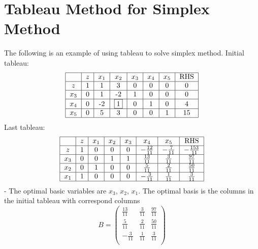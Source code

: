 			\section{Tableau Method for Simplex Method}
				The following is an example of using tableau to solve simplex method.
					Initial tableau:\\
					\begin{align}
						\begin{tabular} {|c|c|c|c|c|c|c|c|}
							\hline
							& $z$ & $x_1$ & $x_2$ & $x_3$ & $x_4$ & $x_5$ & RHS \\
							\hline
							$z$ & 1 & 1 & 3 & 0 & 0 & 0 & 0 \\
							\hline
							$x_3$ & 0 & 1 & -2 & 1 & 0 & 0 & 0 \\
							\hline
							$x_4$ & 0 & -2 & \framebox{1} & 0 & 1 & 0 & 4\\
							\hline
							$x_5$ & 0 & 5 & 3 & 0 & 0 & 1 & 15 \\
							\hline
						\end{tabular}
					\end{align}
					Last tableau:\\
					\begin{align}
						\begin{tabular} {|c|c|c|c|c|c|c|c|}
							\hline
							& $z$ & $x_1$ & $x_2$ & $x_3$ & $x_4$ & $x_5$ & RHS \\
							\hline
							$z$ & 1 & 0 & 0 & 0 & $-\frac{12}{11}$ & $-\frac{7}{11}$ & $-\frac{153}{11}$ \\
							\hline
							$x_3$ & 0 & 0 & 1 & 1 & $\frac{13}{11}$ & $\frac{3}{11}$ & $\frac{97}{11}$ \\
							\hline
							$x_2$ & 0 & 1 & 0 & 0 & $\frac{5}{11}$ & $\frac{2}{11}$ & $\frac{50}{11}$ \\
							\hline
							$x_1$ & 1 & 0 & 0 & 0 & $-\frac{3}{11}$ & $\frac{1}{11}$ & $\frac{3}{11}$ \\
							\hline
						\end{tabular}
					\end{align}
					- The optimal basic variables are $x_3$, $x_2$, $x_1$. The optimal basis is the columns in the initial tableau with correspond columns
					\begin{equation}
						B = \left(\begin{matrix}
							\frac{13}{11} & \frac{3}{11} & \frac{97}{11}\\
							\frac{5}{11} & \frac{2}{11} & \frac{50}{11}\\
							-\frac{3}{11} & \frac{1}{11} & \frac{3}{11}\\
						\end{matrix}\right)
					\end{equation}
